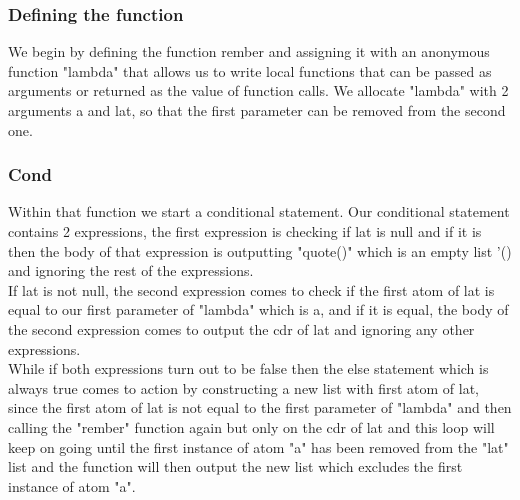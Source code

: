 \documentclass{article}
\begin{document}
\subsubsection{Defining the function}
We begin by defining the function rember and assigning it with an anonymous function "lambda" that allows us to write local functions that can be passed as arguments or returned as the value of function calls.
 We allocate "lambda" with 2 arguments a and lat, so that the first parameter can be removed from the second one.

\subsubsection{Cond}
Within that function we start a conditional statement. Our conditional statement contains 2 expressions, the first expression is checking if lat is null and if it is then the body of that expression is outputting "quote()" which is an empty list '() and ignoring the rest of the expressions.\\


If lat is not null, the second expression comes to check if the first atom of lat is equal to our first parameter of "lambda" which is a, and if it is equal, the body of the second expression comes to output the cdr of lat and ignoring any other expressions.\\


While if both expressions turn out to be false then the else statement which is always true comes to action by constructing a new list with first atom of lat, since the first atom of lat is not equal to the first parameter of "lambda" and then calling the "rember" function again but only on the cdr of lat and this loop will keep on going until the first instance of atom "a" has been removed from the "lat" list and the function will then output the new list which excludes the first instance of atom "a".
\end{document}
